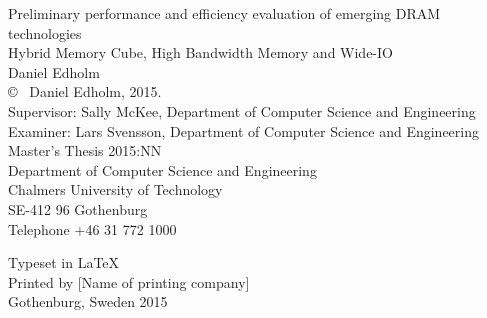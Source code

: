 \newpage
\thispagestyle{plain}
\vspace*{4.5cm}
Preliminary performance and efficiency evaluation of emerging DRAM technologies\\
Hybrid Memory Cube, High Bandwidth Memory and Wide-IO\\
Daniel Edholm\\[0.5cm]

\copyright ~ Daniel Edholm, 2015.\\[0.5cm]

Supervisor: Sally McKee, Department of Computer Science and Engineering\\
Examiner: Lars Svensson, Department of Computer Science and Engineering\\[0.5cm]

Master's Thesis 2015:NN\\
Department of Computer Science and Engineering\\
Chalmers University of Technology\\
SE-412 96 Gothenburg\\
Telephone +46 31 772 1000\\

\vfill

Typeset in \LaTeX \\
Printed by [Name of printing company]\\
Gothenburg, Sweden 2015
